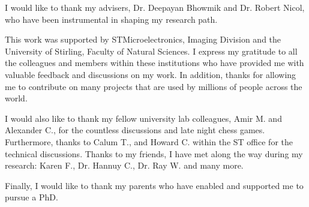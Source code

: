 I would like to thank my advisers, Dr. Deepayan Bhowmik and Dr. Robert Nicol, who have been instrumental in shaping my research path.

This work was supported by STMicroelectronics, Imaging Division and the University of Stirling, Faculty of Natural Sciences. I express my gratitude to all the colleagues and members within these institutions who have provided me with valuable feedback and discussions on my work. In addition, thanks for allowing me to contribute on many projects that are used by millions of people across the world.

I would also like to thank my fellow university lab colleagues, Amir M. and Alexander C., for the countless discussions and late night chess games. Furthermore, thanks to Calum T., and Howard C. within the ST office for the technical discussions. Thanks to my friends, I have met along the way during my research: Karen F., Dr. Hannuy C., Dr. Ray W. and many more. 

Finally, I would like to thank my parents who have enabled and supported me to pursue a PhD.